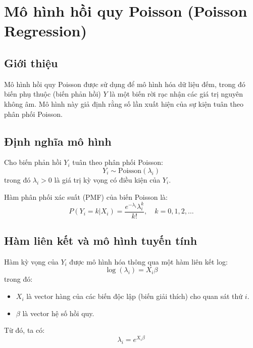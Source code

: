 \chapter{Mô hình hồi quy Poisson (Poisson Regression)}
\section{Giới thiệu}
Mô hình hồi quy Poisson được sử dụng để mô hình hóa dữ liệu đếm, trong đó biến phụ thuộc (biến phản hồi) $Y$ là một biến rời rạc nhận các giá trị nguyên không âm. Mô hình này giả định rằng số lần xuất hiện của sự kiện tuân theo phân phối Poisson.

\section{Định nghĩa mô hình}
Cho biến phản hồi $Y_i$ tuân theo phân phối Poisson:
\begin{equation}
    Y_i \sim \text{Poisson}(\lambda_i)
\end{equation}
trong đó $\lambda_i > 0$ là giá trị kỳ vọng có điều kiện của $Y_i$.

Hàm phân phối xác suất (PMF) của biến Poisson là:
\begin{equation}
    P(Y_i = k | X_i) = \frac{e^{-\lambda_i} \lambda_i^k}{k!}, \quad k = 0, 1, 2, \dots
\end{equation}

\section{Hàm liên kết và mô hình tuyến tính}
Hàm kỳ vọng của $Y_i$ được mô hình hóa thông qua một hàm liên kết log:
\begin{equation}
    \log(\lambda_i) = X_i \beta
\end{equation}
trong đó:
\begin{itemize}
    \item $X_i$ là vector hàng của các biến độc lập (biến giải thích) cho quan sát thứ $i$.
    \item $\beta$ là vector hệ số hồi quy.
\end{itemize}
Từ đó, ta có:
\begin{equation}
    \lambda_i = e^{X_i \beta}
\end{equation}

